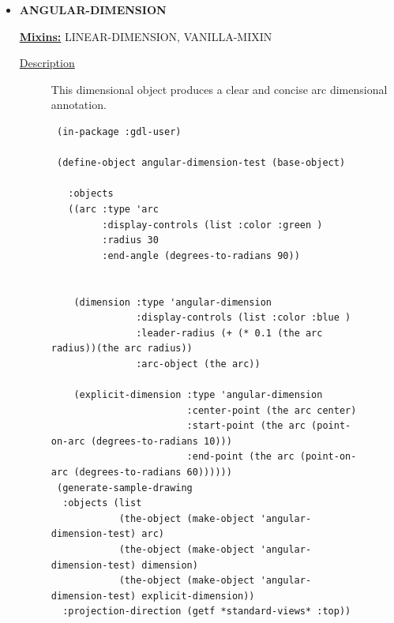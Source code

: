 \documentclass [11pt]{book}
\begin{document}
\begin{itemize}

\item {}
\textbf{ANGULAR-DIMENSION}


\textbf{
\underline{Mixins:}} LINEAR-DIMENSION, VANILLA-MIXIN





\begin{description}

\item [
\underline{Description}]


This dimensional object produces a clear and concise arc dimensional annotation.



\end{description}




\begin{figure}
\begin{lrbox}{\boxedverb}
\begin{minipage}{\linewidth}
{\small

\begin{verbatim}
 (in-package :gdl-user)

 (define-object angular-dimension-test (base-object) 
   
   :objects 
   ((arc :type 'arc
         :display-controls (list :color :green )
         :radius 30
         :end-angle (degrees-to-radians 90))
    
    
    (dimension :type 'angular-dimension
               :display-controls (list :color :blue )
               :leader-radius (+ (* 0.1 (the arc radius))(the arc radius))
               :arc-object (the arc))
    
    (explicit-dimension :type 'angular-dimension
                        :center-point (the arc center)
                        :start-point (the arc (point-on-arc (degrees-to-radians 10)))
                        :end-point (the arc (point-on-arc (degrees-to-radians 60))))))
 (generate-sample-drawing 
  :objects (list 
            (the-object (make-object 'angular-dimension-test) arc) 
            (the-object (make-object 'angular-dimension-test) dimension)
            (the-object (make-object 'angular-dimension-test) explicit-dimension))
  :projection-direction (getf *standard-views* :top))
 
  
\end{verbatim}}
\end{minipage}
\end{lrbox}
\fbox{\usebox{\boxedverb}}


\end{figure}
\end{itemize}
\end{document}
